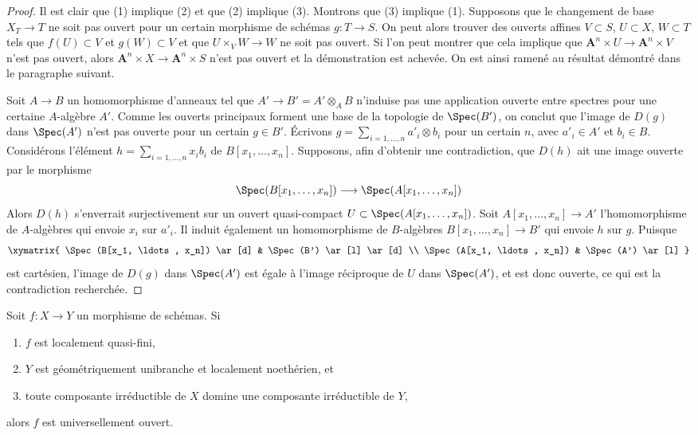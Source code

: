 \begin{proof}
Il est clair que (1) implique (2) et que (2) implique (3).
Montrons que (3) implique (1).
Supposons que le changement de base $X_T \to T$ ne soit pas ouvert
pour un certain morphisme de schémas $g : T \to S$.
On peut alors trouver des ouverts affines
$V \subset S$, $U \subset X$, $W \subset T$
tels que $f(U) \subset V$ et $g(W) \subset V$
et que $U \times_V W \to W$ ne soit pas ouvert.
Si l'on peut montrer que cela implique que
$\mathbf{A}^n \times U \to \mathbf{A}^n \times V$
n'est pas ouvert, alors $\mathbf{A}^n \times X \to \mathbf{A}^n \times S$
n'est pas ouvert et la démonstration est achevée. On est ainsi ramené
au résultat démontré dans le paragraphe suivant.

\medskip\noindent
Soit $A \to B$ un homomorphisme d'anneaux tel que $A' \to B' = A' \otimes_A B$
n'induise pas une application ouverte entre spectres pour une certaine $A$-algèbre $A'$.
Comme les ouverts principaux forment une base de la topologie de $\Spec(B')$,
on conclut que l'image de $D(g)$ dans $\Spec(A')$
n'est pas ouverte pour un certain $g \in B'$. Écrivons
$g = \sum_{i = 1, \ldots, n} a'_i \otimes b_i$
pour un certain $n$, avec $a'_i \in A'$ et $b_i \in B$.
Considérons l'élément $h = \sum_{i = 1, \ldots, n} x_i b_i$
de $B[x_1, \ldots, x_n]$. Supposons, afin d'obtenir une contradiction, que $D(h)$ ait une image
ouverte par le morphisme
$$
\Spec(B[x_1, \ldots, x_n]) \longrightarrow \Spec(A[x_1, \ldots, x_n])
$$
Alors $D(h)$ s'enverrait surjectivement sur un ouvert quasi-compact
$U \subset \Spec(A[x_1, \ldots, x_n])$.
Soit $A[x_1, \ldots, x_n] \to A'$ l'homomorphisme de $A$-algèbres
qui envoie $x_i$ sur $a'_i$. Il induit également un homomorphisme de $B$-algèbres
$B[x_1, \ldots, x_n] \to B'$ qui envoie $h$ sur $g$.
Puisque
$$
\xymatrix{
\Spec(B[x_1, \ldots, x_n]) \ar[d] &
\Spec(B') \ar[l] \ar[d] \\
\Spec(A[x_1, \ldots, x_n]) &
\Spec(A') \ar[l]
}
$$
est cartésien, l'image de $D(g)$ dans $\Spec(A')$ est égale à
l'image réciproque de $U$ dans $\Spec(A')$, et est donc ouverte, ce qui est
la contradiction recherchée.
\end{proof}

\begin{lemma}
\label{lemma-quasi-finite-Noetherian-universally-open}
Soit $f : X \to Y$ un morphisme de schémas. Si
\begin{enumerate}
\item $f$ est localement quasi-fini,
\item $Y$ est géométriquement unibranche et localement noethérien, et
\item toute composante irréductible de $X$ domine
une composante irréductible de $Y$,
\end{enumerate}
alors $f$ est universellement ouvert.
\end{lemma}

